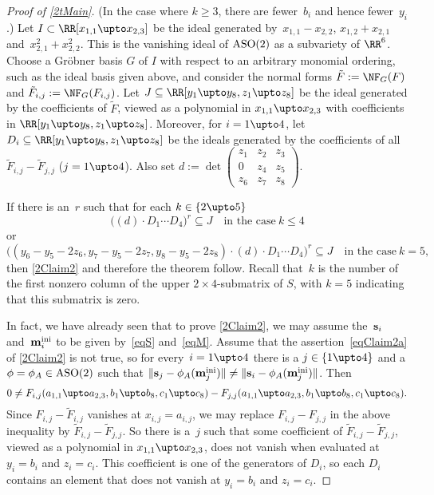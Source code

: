 \documentclass[reqno]{amsart}
\begin{document}
\begin{proof}[Proof of \cref{2tMain}]
  (In the case where $k \ge 3$, there are fewer~$b_i$ and hence
  fewer~$y_i$.)  Let $I \subset \RR[x_{1,1} \upto x_{2,3}]$ be the
  ideal generated by~$x_{1,1} - x_{2,2}$, $x_{1,2} + x_{2,1}$
  and~$x_{2,1}^2 + x_{2,2}^2$.  This is the vanishing ideal of
  $\operatorname{ASO}(2)$ as a subvariety of $\RR^6$. Choose a Gr\"obner basis $G$
  of $I$ with respect to an arbitrary monomial ordering, such as the
  ideal basis given above, and consider the normal forms
  $\tilde{F} := \NF_G(F)$ and $\tilde{F}_{i,j} := \NF_G(F_{i,j})$. Let
  $J \subseteq \RR[y_1 \upto y_8,z_1 \upto z_8]$ be the ideal
  generated by the coefficients of $\tilde{F}$, viewed as a polynomial
  in $x_{1,1} \upto x_{2,3}$ with coefficients in
  $\RR[y_1 \upto y_8,z_1 \upto z_8]$. Moreover, for $i = 1 \upto 4$,
  let $D_i \subseteq \RR[y_1 \upto y_8,z_1 \upto z_8]$ be the ideals
  generated by the coefficients of all
  $\tilde{F}_{i,j} - \tilde{F}_{j,j}$ ($j = 1 \upto 4$).  Also set $d
  := \det\left(\begin{smallmatrix} z_1 & z_2 & z_3 \\ 0 & z_4 & z_5 \\
      z_6 & z_7 & z_8\end{smallmatrix}\right)$.
  \begin{claim} \label{2Claim3}%
    If there is an~$r$ such that for each $k \in \{2 \upto 5\}$
    \begin{equation} \label{eqClaim3a}%
      \bigl((d) \cdot D_1 \cdots D_4\bigr)^r \subseteq J \quad
      \text{in the case} \ k \le 4
    \end{equation}
    or
    \begin{equation} \label{eqClaim3b}%
      \bigl((y_6 - y_5 - 2 z_6,y_7 - y_5 - 2 z_7,y_8 - y_5 - 2
      z_8)\cdot (d) \cdot D_1 \cdots D_4\bigr)^r \subseteq J \quad
      \text{in the case} \ k = 5,
    \end{equation}
    then \cref{2Claim2} and therefore the theorem follow. Recall
    that~$k$ is the number of the first nonzero column of the upper
    $2 \times 4$-submatrix of $S$, with $k = 5$ indicating that this
    submatrix is zero.
  \end{claim}
  In fact, we have already seen that to prove \cref{2Claim2}, we may
  assume the~$\mathbf{s}_i$ and~$\mathbf{m}_i^{\operatorname{ini}}$ to be given by~\eqref{eqS}
  and~\eqref{eqM}. Assume that the assertion~\eqref{eqClaim2a} of
  \cref{2Claim2} is not true, so for every~$i = 1 \upto 4$ there is a
  $j \in \{1 \upto 4\}$ and a $\phi = \phi_A \in \operatorname{ASO}(2)$ such that
  $\lVert\mathbf{s}_j - \phi_A(\mathbf{m}_j^{\operatorname{ini}})\rVert \ne \lVert\mathbf{s}_i -
  \phi_A(\mathbf{m}_j^{\operatorname{ini}})\rVert$. Then
  \[
    0 \ne F_{i,j}(a_{1,1} \upto a_{2,3},b_1 \upto b_8,c_1 \upto c_8) -
    F_{j,j}(a_{1,1} \upto a_{2,3},b_1 \upto b_8,c_1 \upto c_8).
  \]
  Since $F_{i,j} - \tilde{F}_{i,j}$ vanishes at $x_{i,j} = a_{i,j}$,
  we may replace $F_{i,j}- F_{j,j}$ in the above inequality by
  $\tilde{F}_{i,j}- \tilde{F}_{j,j}$. So there is a~$j$ such that some
  coefficient of $\tilde{F}_{i,j}- \tilde{F}_{j,j}$, viewed as a
  polynomial in $x_{1,1} \upto x_{2,3}$, does not vanish when
  evaluated at $y_i = b_i$ and $z_i = c_i$. This coefficient is one of
  the generators of $D_i$, so each $D_i$ contains an element that does
  not vanish at $y_i = b_i$ and $z_i = c_i$.


\end{proof}
\end{document}
